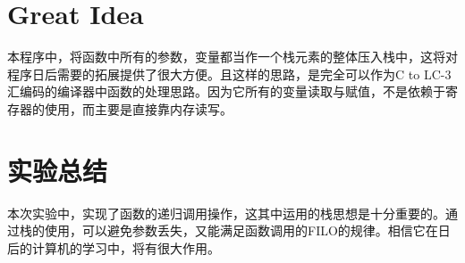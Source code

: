 \documentclass[UTF8]{article}
\begin{document}
\section{Great Idea}
本程序中，将函数中所有的参数，变量都当作一个栈元素的整体压入栈中，这将对程序日后需要的拓展提供了很大方便。且这样的思路，是完全可以作为C to LC-3汇编码的编译器中函数的处理思路。因为它所有的变量读取与赋值，不是依赖于寄存器的使用，而主要是直接靠内存读写。\par



\section{实验总结}
本次实验中，实现了函数的递归调用操作，这其中运用的栈思想是十分重要的。通过栈的使用，可以避免参数丢失，又能满足函数调用的FILO的规律。相信它在日后的计算机的学习中，将有很大作用。
\end{document}
